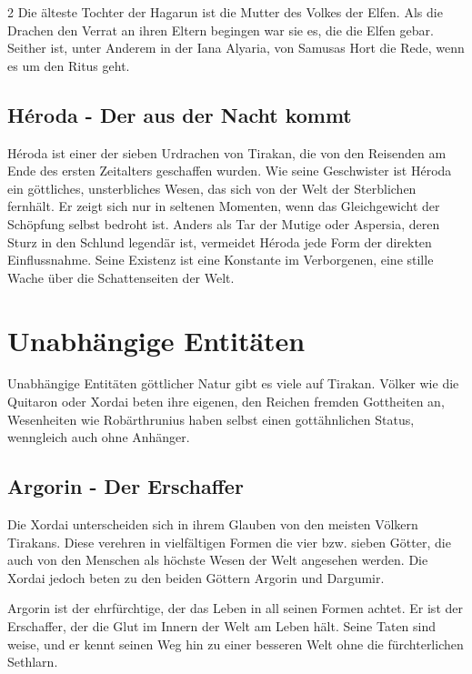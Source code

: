 \begin{multicols*}{2}
Die älteste Tochter der Hagarun ist die Mutter des Volkes der Elfen.
Als die Drachen den Verrat an ihren Eltern begingen war sie es, die die Elfen gebar.
Seither ist, unter Anderem in der Iana Alyaria, von Samusas Hort die Rede, wenn es um den Ritus geht.

\subsection{Héroda - Der aus der Nacht kommt}\label{subsec:heroda-der-aus-der-nacht-kommt}

Héroda ist einer der sieben Urdrachen von Tirakan, die von den Reisenden am Ende des ersten Zeitalters geschaffen wurden.
Wie seine Geschwister ist Héroda ein göttliches, unsterbliches Wesen, das sich von der Welt der Sterblichen fernhält.
Er zeigt sich nur in seltenen Momenten, wenn das Gleichgewicht der Schöpfung selbst bedroht ist.
Anders als Tar der Mutige oder Aspersia, deren Sturz in den Schlund legendär ist, vermeidet Héroda jede Form der direkten Einflussnahme.
Seine Existenz ist eine Konstante im Verborgenen, eine stille Wache über die Schattenseiten der Welt.


\section{Unabhängige Entitäten}\label{sec:unabhangige-entitaten}

Unabhängige Entitäten göttlicher Natur gibt es viele auf Tirakan.
Völker wie die Quitaron oder Xordai beten ihre eigenen, den Reichen fremden Gottheiten an, Wesenheiten wie Robärthrunius haben selbst einen gottähnlichen Status, wenngleich auch ohne Anhänger.


\subsection{Argorin - Der Erschaffer}\label{subsec:argorin-der-erschaffer}

Die Xordai unterscheiden sich in ihrem Glauben von den meisten Völkern Tirakans.
Diese verehren in vielfältigen Formen die vier bzw.
sieben Götter, die auch von den Menschen als höchste Wesen der Welt angesehen werden.
Die Xordai jedoch beten zu den beiden Göttern Argorin und Dargumir.

Argorin ist der ehrfürchtige, der das Leben in all seinen Formen achtet.
Er ist der Erschaffer, der die Glut im Innern der Welt am Leben hält.
Seine Taten sind weise, und er kennt seinen Weg hin zu einer besseren Welt ohne die fürchterlichen Sethlarn.



\end{multicols*}
